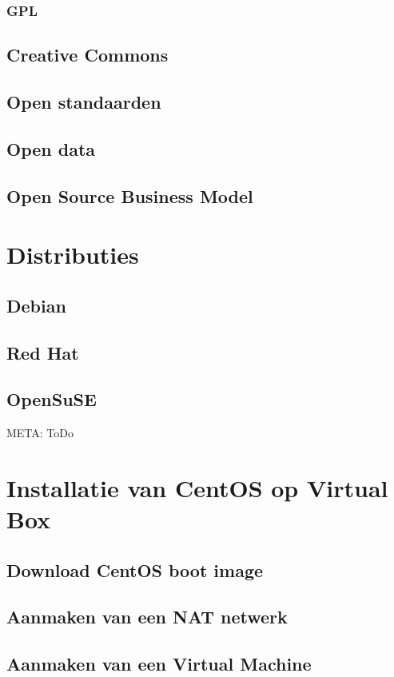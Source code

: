 \documentclass[a4paper,12pt,twoside,openright,titlepage]{book}
\begin{document}
\subsection{GPL}

\section{Creative Commons}

\section{Open standaarden}

\section{Open data}

\section{Open Source Business Model}


\chapter{Distributies}

\section{Debian}

\section{Red Hat}

\section{OpenSuSE}
META: ToDo

\chapter{Installatie van CentOS op Virtual Box}
\section{Download CentOS boot image}

\section{Aanmaken van een NAT netwerk}

\section{Aanmaken van een Virtual Machine}

\end{document}
